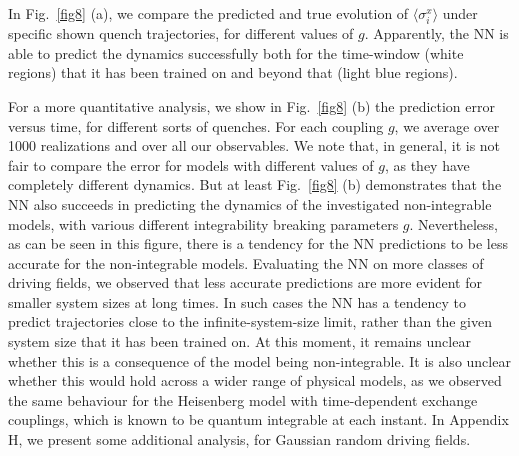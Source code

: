 \documentclass[a4paper,aps,amsmath,amssymb,twocolumn,longbibliography,,accepted=2022-05-17]{quantumarticle}
\begin{document}
In Fig.~\ref{fig8} (a), we compare the predicted and true evolution of $\langle \sigma_{i}^{x} \rangle$ under specific shown quench trajectories, for different values of $ g $.  Apparently, the NN is able to predict the dynamics successfully both for the time-window (white regions) that it has been trained on and beyond that (light blue regions).

For a more quantitative analysis, we show in Fig.~\ref{fig8} (b) the prediction error versus time, for different sorts of quenches. For each coupling $g$, we average over 1000 realizations and over all our observables. We note that, in general, it is not fair to compare the error for models with different values of $g$, as they have completely different dynamics. But at least Fig.~\ref{fig8} (b) demonstrates that the NN also succeeds in predicting the dynamics of the investigated non-integrable models, with various different integrability breaking parameters $g$. Nevertheless, as can be seen in this figure, there is a tendency for the NN predictions to be less accurate for the non-integrable models. Evaluating the NN on more classes of driving fields, we observed that less accurate predictions are more evident for smaller system sizes  at long times. In such cases the NN has a tendency to predict trajectories close to the infinite-system-size limit, rather than the given system size that it has been trained on. At this moment, it remains unclear whether this is a consequence of the model being non-integrable. It is also unclear whether this would hold across a wider range of physical models, as we observed the same behaviour for the Heisenberg model with time-dependent exchange couplings, which is known to be  quantum integrable at each instant. In  Appendix H, we present some additional analysis, for Gaussian random driving fields. %
\end{document}
